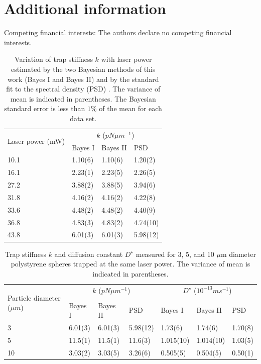 \documentclass[fleqn,10pt]{wlscirep}
\begin{document}
\section*{Additional information}
Competing financial interests: The authors declare no competing financial interests.
\begin{table}[ht]
\centering
\begin{tabular}{|l|l|l|l|}
\hline
\multirow{2}{2cm}{Laser power (mW) } & \multicolumn{3}{c}{$k$ ($pN\mu m^{-1}$)}\tabularnewline
\cmidrule{2-4} 
 & Bayes I & Bayes II & PSD\tabularnewline
\midrule
10.1 & 1.10(6) & 1.10(6) & 1.20(2)\tabularnewline
\midrule
16.1 & 2.23(1) & 2.23(5) & 2.26(5) \tabularnewline
\midrule
27.2 & 3.88(2) & 3.88(5) &  3.94(6)\tabularnewline
\midrule
31.8 & 4.16(2) & 4.16(2) & 4.22(8)\tabularnewline
\midrule
33.6 & 4.48(2) & 4.48(2) & 4.40(9)\tabularnewline
\midrule
36.8 & 4.83(3) & 4.83(2) & 4.74(10)\tabularnewline
\midrule
43.8 & 6.01(3) & 6.01(3) & 5.98(12)\tabularnewline
\bottomrule
\end{tabular}\caption{Variation of trap stiffness $k$ with laser power estimated by the
two Bayesian methods of this work (Bayes I and Bayes II) and by the
standard fit to the spectral density (PSD) \cite{berg2004power}.
The variance of mean is indicated in parentheses. The Bayesian standard
error is less than $1\%$ of the mean for each data set. \label{tab:k-versus-power}}
\end{table}
\begin{table}
\begin{tabular}{|l|l|l|l|l|l|l|}
\hline 
\multirow{3}{2cm}{Particle diameter ($\mu m$)} & \multicolumn{3}{c}{$k$ ($pN\mu m^{-1}$)} & \multicolumn{3}{c}{$D^{\star}$ ($10^{-13}ms^{-1}$)}\tabularnewline
 &  &  &  &  &  & \tabularnewline
\cmidrule{2-7} 
 & Bayes I & Bayes II & PSD & Bayes I & Bayes II & PSD\tabularnewline
\midrule
3 & 6.01(3) & 6.01(3) & 5.98(12) & 1.73(6) & 1.74(6) & 1.70(8)\tabularnewline
\midrule
5 & 11.5(1) & 11.5(1) & 11.6(3)  & 1.015(10) & 1.014(10) & 1.03(5) \tabularnewline
\midrule
10 & 3.03(2) & 3.03(5) &  3.26(6) & 0.505(5) & 0.504(5) &  0.50(1)\tabularnewline
\bottomrule
\end{tabular}\caption{\label{tab:k-different-dia}Trap stiffness $k$ and diffusion constant
$D^{\star}$ measured for 3, 5, and 10 $\mu$m diameter polystyrene
spheres trapped at the same laser power. The variance of mean is indicated
in parentheses. }
\end{table}
\end{document}
